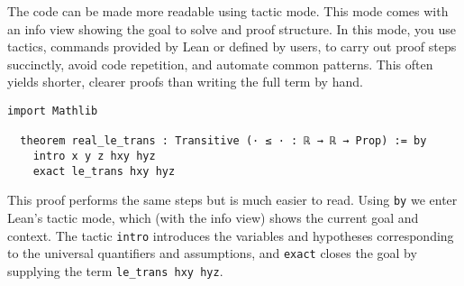 \begin{example}
  The code can be made more readable using tactic mode. 
  This mode comes with an info view showing the goal to solve and proof structure.
  In this mode, you use tactics, commands provided by Lean or defined by users,
  to carry out proof steps succinctly, avoid code repetition, 
  and automate common patterns. 
  This often yields shorter, clearer proofs than writing the full term by hand.
  \begin{lstlisting}[language=lean]
  import Mathlib

  theorem real_le_trans : Transitive (· ≤ · : ℝ → ℝ → Prop) := by
    intro x y z hxy hyz
    exact le_trans hxy hyz
  \end{lstlisting}
  This proof performs the same steps but is much easier to read. 
  Using \lstinline[language=lean]|by| we enter Lean’s tactic mode, which (with the info view) 
  shows the current goal and context. The tactic \lstinline[language=lean]|intro| introduces 
  the variables and hypotheses corresponding to the universal quantifiers 
  and assumptions, and \lstinline[language=lean]|exact| closes the goal 
  by supplying the term \lstinline[language=lean]|le_trans hxy hyz|.
\end{example}

